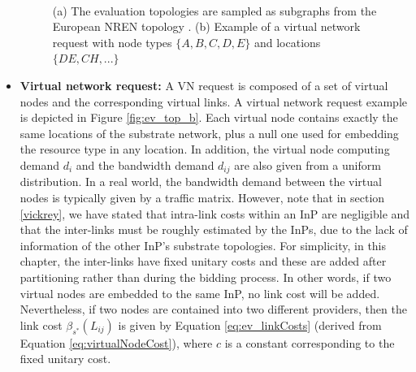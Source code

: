 \begin{itemize}
\begin{figure}[bth]
	\myfloatalign
	 \quad
	 \\
	\caption{(a) The evaluation topologies are sampled as subgraphs from the European NREN topology \citep{zoo}. (b) Example of a virtual network request with node types $\{A, B, C, D, E\}$ and locations $\{DE, CH, ...\}$ }
	\label{fig:ev_top}
\end{figure}

\item \textbf{Virtual network request:} A VN request is composed of a set of virtual nodes and the corresponding virtual links. A virtual network request example is depicted in Figure \ref{fig:ev_top_b}. Each virtual node contains exactly the same locations of the substrate network, plus a null one used for embedding the resource type in any location. In addition, the virtual node computing demand $d_i$ and the bandwidth demand $d_{ij}$ are also given from a uniform distribution. In a real world, the bandwidth demand between the virtual nodes is typically given by a traffic matrix. However, note that in section \ref{vickrey}, we have stated that intra-link costs within an InP are negligible and that the inter-links must be roughly estimated by the InPs, due to the lack of information of the other InP's substrate topologies. For simplicity, in this chapter, the inter-links have fixed unitary costs and these are added after partitioning rather than during the bidding process. In other words, if two virtual nodes are embedded to the same InP, no link cost will be added. Nevertheless, if two nodes are contained into two different providers, then the link cost $\beta_{s^{*}}(L_{ij})$ is given by Equation \ref{eq:ev_linkCosts} (derived from Equation \ref{eq:virtualNodeCost}), where $c$ is a constant corresponding to the fixed unitary cost.

\end{itemize}

